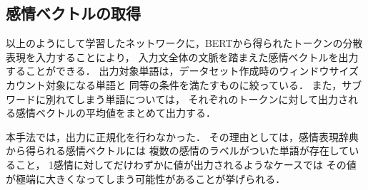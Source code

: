 		\subsection{感情ベクトルの取得}
			以上のようにして学習したネットワークに，BERTから得られたトークンの分散表現を入力することにより，
			入力文全体の文脈を踏まえた感情ベクトルを出力することができる．
			出力対象単語は，データセット作成時のウィンドウサイズカウント対象になる単語と
			同等の条件を満たすものに絞っている．
			また，サブワードに別れてしまう単語については，
			それぞれのトークンに対して出力される感情ベクトルの平均値をまとめて出力する．

			本手法では，出力に正規化を行わなかった．
			その理由としては，感情表現辞典から得られる感情ベクトルには
			複数の感情のラベルがついた単語が存在していること，
			1感情に対してだけわずかに値が出力されるようなケースでは
			その値が極端に大きくなってしまう可能性があることが挙げられる．
